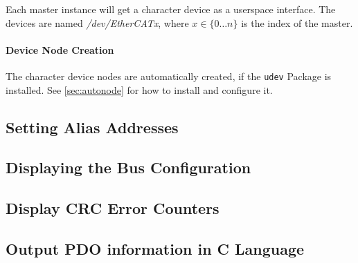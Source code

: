 \documentclass[a4paper,12pt,BCOR=6mm,bibtotoc,idxtotoc]{scrbook}
\begin{document}
Each master instance will get a character device as a userspace interface.
The devices are named \textit{/dev/EtherCATx}, where $x \in \{0 \ldots n\}$ is
the index of the master.

\paragraph{Device Node Creation} The character device nodes are automatically
created, if the \lstinline+udev+ Package is installed. See
\autoref{sec:autonode} for how to install and configure it.


\subsection{Setting Alias Addresses}
\label{sec:ethercat-alias}




\subsection{Displaying the Bus Configuration}
\label{sec:ethercat-config}




\subsection{Display CRC Error Counters}
\label{sec:ethercat-crc}




\subsection{Output PDO information in C Language}
\label{sec:ethercat-cstruct}


\end{document}

